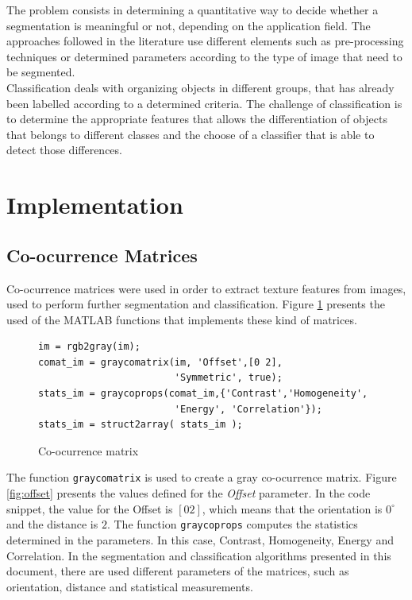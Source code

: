 \documentclass{IEEEtran}
\begin{document}
The problem consists in determining a quantitative way to decide whether a
segmentation is meaningful or not, depending on the application field. The
approaches followed in the literature use different elements such as
pre-processing techniques or determined parameters according to the 
type of image that need to be segmented. \cite{haralick1985image}\\

Classification deals with organizing objects in different groups, that has already been labelled according to a determined criteria. The challenge of classification is to determine the appropriate features that allows the differentiation of objects that belongs to different classes and the choose of a classifier that is able to detect those differences.

\section{Implementation}

\subsection{Co-ocurrence Matrices}

Co-ocurrence matrices were used in order to extract texture features from images, used to perform further segmentation and classification. Figure \ref{code:co_matrix} presents the used of the MATLAB functions that implements these kind of matrices. 

\begin{figure}[h!]
\begin{lstlisting}
im = rgb2gray(im);
comat_im = graycomatrix(im, 'Offset',[0 2], 
						'Symmetric', true);
stats_im = graycoprops(comat_im,{'Contrast','Homogeneity', 
						'Energy', 'Correlation'});
stats_im = struct2array( stats_im );
\end{lstlisting} 
 \caption{Co-ocurrence matrix}
 \label{code:co_matrix}
\end{figure}

The function \texttt{graycomatrix} is used to create a gray co-ocurrence matrix. Figure \ref{fig:offset} presents the values defined for the \textit{Offset} parameter. In the code snippet, the value for the Offset is $[0 2]$, which means that the orientation is $0^{\circ}$ and the distance is $2$. The function \texttt{graycoprops} computes the statistics determined in the parameters. In this case, Contrast, Homogeneity, Energy and Correlation. In the segmentation and classification algorithms presented in this document, there are used different parameters of the matrices, such as orientation, distance and statistical measurements.
\end{document}
